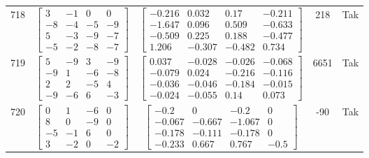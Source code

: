 \documentclass[a4paper,12pt]{article}
\begin{document}
\begin{tabular}{c c c c c}
718
&
$\begin{bmatrix} 3 & -1 & 0 & 0 \\ -8 & -4 & -5 & -9 \\ 5 & -3 & -9 & -7 \\ -5 & -2 & -8 & -7 \end{bmatrix}$
&
$\begin{bmatrix} -0.216 & 0.032 & 0.17 & -0.211 \\ -1.647 & 0.096 & 0.509 & -0.633 \\ -0.509 & 0.225 & 0.188 & -0.477 \\ 1.206 & -0.307 & -0.482 & 0.734 \end{bmatrix}$
&
218
&
Tak
\\
719
&
$\begin{bmatrix} 5 & -9 & 3 & -9 \\ -9 & 1 & -6 & -8 \\ 2 & 2 & -5 & 4 \\ -9 & -6 & 6 & -3 \end{bmatrix}$
&
$\begin{bmatrix} 0.037 & -0.028 & -0.026 & -0.068 \\ -0.079 & 0.024 & -0.216 & -0.116 \\ -0.036 & -0.046 & -0.184 & -0.015 \\ -0.024 & -0.055 & 0.14 & 0.073 \end{bmatrix}$
&
6651
&
Tak
\\
720
&
$\begin{bmatrix} 0 & 1 & -6 & 0 \\ 8 & 0 & -9 & 0 \\ -5 & -1 & 6 & 0 \\ 3 & -2 & 0 & -2 \end{bmatrix}$
&
$\begin{bmatrix} -0.2 & 0 & -0.2 & 0 \\ -0.067 & -0.667 & -1.067 & 0 \\ -0.178 & -0.111 & -0.178 & 0 \\ -0.233 & 0.667 & 0.767 & -0.5 \end{bmatrix}$
&
-90
&
Tak
\\
\end{tabular} \egroup \newpage
\end{document}

